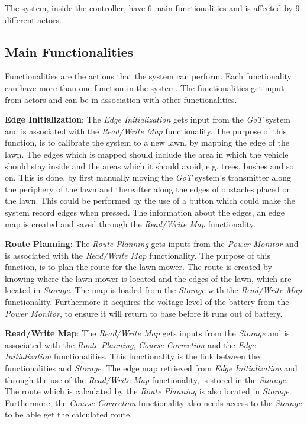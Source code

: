 \noindent
\newpage

The system, inside the controller, have 6 main functionalities and is affected by 9 different actors.

\subsection{Main Functionalities}

Functionalities are the actions that the system can perform. Each functionality can have more than one function in the system. The functionalities get input from actors and can be in association with other functionalities. 

\textbf{Edge Initialization}:
The \textit{Edge Initialization} gets input from the \textit{GoT} system and is associated with the \textit{Read/Write Map} functionality. The purpose of this function, is to calibrate the system to a new lawn, by mapping the edge of the lawn. The edges which is mapped should include the area in which the vehicle should stay inside and the areas which it should avoid, e.g. trees, bushes and so on. This is done, by first manually moving the \textit{GoT} system's transmitter along the periphery of the lawn and thereafter along the edges of obstacles placed on the lawn. This could be performed by the use of a button which could make the system record edges when pressed. The information about the edges, an edge map is created and saved through the \textit{Read/Write Map} functionality.

\textbf{Route Planning}:
The \textit{Route Planning} gets inputs from the \textit{Power Monitor} and is associated with the \textit{Read/Write Map} functionality. The purpose of this function, is to plan the route for the lawn mower. The route is created by knowing where the lawn mower is located and the edges of the lawn, which are located in \textit{Storage}. The map is loaded from the \textit{Storage} with the \textit{Read/Write Map} functionality. Furthermore it acquires the voltage level of the battery from the \textit{Power Monitor}, to ensure it will return to base before it runs out of battery.

\textbf{Read/Write Map}:
The \textit{Read/Write Map} gets inputs from the \textit{Storage} and is associated with the \textit{Route Planning}, \textit{Course Correction} and the \textit{Edge Initialization} functionalities. This functionality is the link between the functionalities and \textit{Storage}. The edge map retrieved from \textit{Edge Initialization} and through the use of the \textit{Read/Write Map} functionality, is stored in the \textit{Storage}. The route which is calculated by the \textit{Route Planning} is also located in \textit{Storage}. Furthermore, the \textit{Course Correction} functionality also needs access to the \textit{Storage} to be able get the calculated route.

